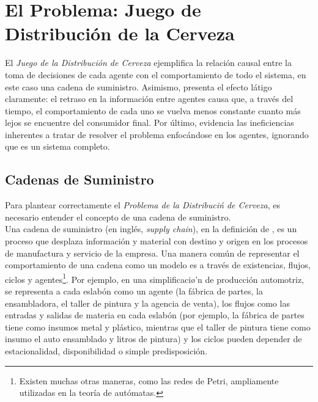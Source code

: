 \chapter{El Problema: Juego de Distribuci\'on de la Cerveza}

El \textit{Juego de la Distribución de Cerveza} ejemplifica la relaci\'on causal entre la toma de decisiones de cada agente con el comportamiento de todo el sistema, en este caso una cadena de suministro. Asimismo, presenta el efecto l\'atigo claramente: el retraso en la informaci\'on entre agentes causa que, a trav\'es del tiempo, el comportamiento de cada uno se vuelva menos constante cuanto m\'as lejos se encuentre del consumidor final. Por \'ultimo, evidencia las ineficiencias inherentes a tratar de resolver el problema enfoc\'andose en los agentes, ignorando que es un sistema completo. 




\section{Cadenas de Suministro}

Para plantear correctamente el \textit{Problema de la Distribuci\'n de Cerveza}, es necesario entender el concepto de una cadena de suministro. \\

Una cadena de suministro (en ingl\'es, \textit{supply chain}), en la definici\'on de \citet{Jacobs},  es un proceso que desplaza informaci\'on y material con destino y origen en los procesos de manufactura y servicio de la empresa. Una manera com\'un de representar el comportamiento de una cadena como un modelo es a trav\'es de existencias, flujos, ciclos y agentes\footnote{Existen muchas otras maneras, como las redes de Petri, ampliamente utilizadas en la teor\'ia de aut\'omatas.}. Por ejemplo, en una simplificaci\o'n de producci\'on automotriz, se representa a cada eslab\'on como un agente (la f\'abrica de partes, la ensambladora, el taller de pintura y la agencia de venta), los flujos como las entradas y salidas de materia en cada eslab\'on (por ejemplo, la f\'abrica de partes tiene como insumos metal y pl\'astico, mientras que el taller de pintura tiene como insumo el auto ensamblado y litros de pintura) y los ciclos pueden depender de estacionalidad, disponibilidad o simple predisposici\'on.\\

